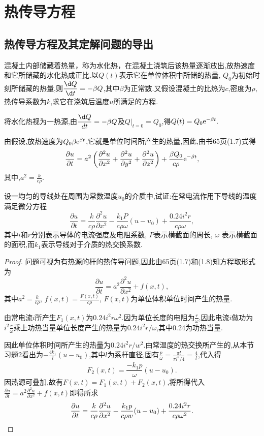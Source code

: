\chapter{热传导方程}

\section{热传导方程及其定解问题的导出}
\begin{exercise}[3]
	混凝土内部储藏着热量，称为水化热，在混凝土浇筑后该热量逐渐放出,放热速度和它所储藏的水化热成正比.以$Q(t)$表示它在单位体积中所储的热量, $Q_0$为初始时刻所储藏的热量,则$\displaystyle\frac{\d Q}{\d t}=-\beta Q$,其中$\beta$为正常数.又假设混凝土的比热为$c$,密度为$\rho$,热传导系数为$k$,求它在浇筑后温度$u$所满足的方程.
\end{exercise}

\begin{solve}
	将水化热视为一热源,由$\displaystyle\frac {\d Q}{dt}=-\beta Q$及$Q|_{t=0}=Q_0$,得$Q(t)=Q_0\mathrm{e}^{-\beta t}.$
	
	由假设,放热速度为$Q_0\beta \mathrm{e}^{\beta t}$,它就是单位时间所产生的热量,因此,由书65页(1.7)式得
	$$\frac{\partial u}{\partial t}=a^2\left(\frac{\partial^2u}{\partial x^2}+\frac{\partial^2u}{\partial y^2}+\frac{\partial^2u}{\partial z^2}\right)+\frac{\beta Q_0}{c\rho}\mathrm{e}^{-\beta t},$$
	其中,$\displaystyle a^2=\frac k{c\rho}.$
\end{solve}


\begin{exercise}[4]
	设一均匀的导线处在周围为常数温度$u_{0}$的介质中,试证:在常电流作用下导线的温度满足微分方程
	$$\frac{\partial u}{\partial t}=\frac{k}{c\rho}\frac{\partial^2u}{\partial x^2}-\frac{k_1P}{c\rho\omega}(u-u_0)+\frac{0.24i^2r}{c\rho\omega},$$
	其中$i$和$r$分别表示导体的电流强度及电阻系数, $P$表示横截面的周长, $\omega$	表示横截面的面积,而$k_{1}$表示导线对于介质的热交换系数.
\end{exercise}

\begin{proof}
	问题可视为有热源的杆的热传导问题,因此由65页(1.7)和(1.8)知方程取形式为
	$$\frac{\partial u}{\partial t}=a^2\frac{\partial^2u}{\partial x^2}+f(x,t),$$
	其中$a^2= \frac k{c\rho}$, $f(x,t)=\frac{F(x,t)}{c\rho}$, $F(x,t)$为单位体积单位时间产生的热量.
	
	由常电流$i$所产生$F_1(x,t)$为$0.24i^2r\omega^2$.因为单位长度的电阻为$\displaystyle\frac r{\omega}$,因此电流$i$做功为$\displaystyle i^2\frac r\omega$乘上功热当量单位长度产生的热量为$0.24i^2r/\omega$,其中0.24为功热当量.
	
	因此单位体积时间所产生的热量为$0.24i^2r/w^2$.由常温度的热交换所产生的,从本节习题2看出为$\displaystyle-\frac{4k_1}l(u-u_0)$,其中$l$为系杆直径,固有$\displaystyle\frac p\omega=\frac{\pi l}{\pi l^2/4}=\frac 4l$,代入得
	\[F_2(x,t)=\frac{-k_1p}{\omega}(u-u_0).\]
	因热源可叠加,故有$F(x,t)=F_1(x,t)+F_2(x,t)$,将所得代入$\displaystyle\frac{\partial u}{\partial t}=a^2\frac{\partial^2u}{\partial x^2}+f(x,t)$即得所求
	\[\frac{\partial u}{\partial t}=\frac{k}{c\rho}\frac{\partial^2u}{\partial x^2}-\frac{k_1p}{c\rho w}(u-u_0)+\frac{0.24i^2r}{c\rho \omega^2}.\qedhere\]
\end{proof}


